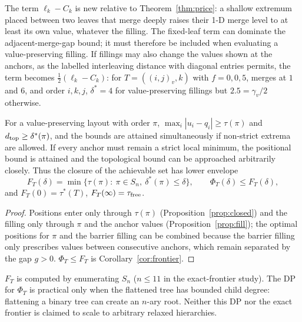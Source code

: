 \begin{remark}The term $\ell_k-C_k$ is new relative to Theorem~\ref{thm:price}: a shallow extremum placed between two leaves that merge deeply raises their 1-D merge level to at least its own value, whatever the filling. The fixed-leaf term can dominate the adjacent-merge-gap bound; it must therefore be included when evaluating a value-preserving filling. If fillings may also change the values shown at the anchors, as the labelled interleaving distance with diagonal entries permits, the term becomes $\frac12(\ell_k-C_k)$: for $T=((i,j)_v,k)$ with $f=0,0,5$, merges at $1$ and $6$, and order $i,k,j$, $\delta^*=4$ for value-preserving fillings but $2.5=\gamma_v/2$ otherwise.\end{remark}

\begin{theorem}\label{thm:exactfrontier}
For a value-preserving layout with order $\pi$, $\max_i|u_i-q_i|\ge\tau(\pi)$ and $d_{\rm top}\ge\delta^*(\pi)$, and the bounds are attained simultaneously if non-strict extrema are allowed. If every anchor must remain a strict local minimum, the positional bound is attained and the topological bound can be approached arbitrarily closely. Thus the closure of the achievable set has lower envelope
\[F_T(\delta)=\min\{\tau(\pi):\ \pi\in S_n,\ \delta^*(\pi)\le\delta\},\qquad \Phi_T(\delta)\le F_T(\delta),\]
and $F_T(0)=\tau^*(T)$, $F_T(\infty)=\tau_{\rm free}$.
\end{theorem}
\begin{proof}Positions enter only through $\tau(\pi)$ (Proposition~\ref{prop:closed}) and the filling only through $\pi$ and the anchor values (Proposition~\ref{prop:fill}); the optimal positions for $\pi$ and the barrier filling can be combined because the barrier filling only prescribes values between consecutive anchors, which remain separated by the gap $g>0$. $\Phi_T\le F_T$ is Corollary~\ref{cor:frontier}.\end{proof}
\begin{remark}$F_T$ is computed by enumerating $S_n$ ($n\le11$ in the exact-frontier study). The DP for $\Phi_T$ is practical only when the flattened tree has bounded child degree: flattening a binary tree can create an $n$-ary root. Neither this DP nor the exact frontier is claimed to scale to arbitrary relaxed hierarchies.\end{remark}

